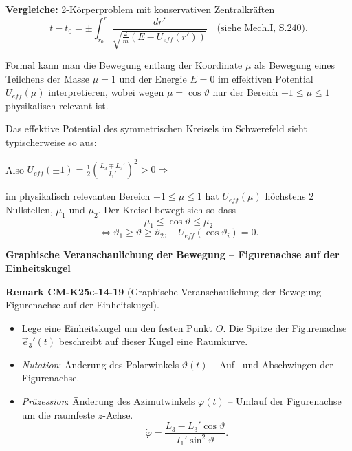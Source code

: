 \documentclass[10pt, letterpaper]{article}
\newcommand{\CustomHeading}[3]{%
  \par\medskip\noindent%
  \textbf{#1 #2} \textnormal{(#3)}.\enskip%
}
\newenvironment{REM}[2]{\begin{unitbox}\CustomHeading{Remark}{#1}{#2}}{\end{unitbox}}
\begin{document}
\textbf{Vergleiche:} 2-Körperproblem mit konservativen Zentralkräften
\[t-t_0 = \pm \int_{r_0}^r \frac{dr'}{\sqrt{\frac{2}{m}(E-U_{eff}(r'))}} \quad \text{(siehe Mech.I, S.240)}.\]

Formal kann man die Bewegung entlang der Koordinate $\mu$ als Bewegung eines Teilchens der Masse $\mu=1$ und der Energie $E=0$ im effektiven Potential $U_{eff}(\mu)$ interpretieren, wobei wegen $\mu=\cos\vartheta$ nur der Bereich $-1\leq\mu\leq1$ physikalisch relevant ist.

Das effektive Potential des symmetrischen Kreisels im Schwerefeld sieht typischerweise so aus:

Also $U_{eff}(\pm 1) = \frac{1}{2}\left(\frac{L_3 \mp L_3'}{I_1'}\right)^2 > 0 \Rightarrow$

im physikalisch relevanten Bereich $-1 \leq \mu \leq 1$ hat $U_{eff}(\mu)$ höchstens 2 Nullstellen, $\mu_1$ und $\mu_2$. Der Kreisel bewegt sich so dass
\[\mu_1 \leq \cos\vartheta \leq \mu_2\]
\[\Leftrightarrow \vartheta_1 \geq \vartheta \geq \vartheta_2, \quad U_{eff}(\cos\vartheta_i) = 0.\]



\textbf{Graphische Veranschaulichung der Bewegung – Figurenachse auf der Einheitskugel}

\begin{REM}{CM-K25c-14-19}{Graphische Veranschaulichung der Bewegung – Figurenachse auf der Einheitskugel}
\begin{itemize}
  \item Lege eine Einheitskugel um den festen Punkt $O$.  
        Die Spitze der Figurenachse $\vec e_3'(t)$ beschreibt auf dieser Kugel eine Raumkurve.
  \item \emph{Nutation}: Änderung des Polarwinkels $\vartheta(t)$ – Auf– und Ab­schwingen der Figurenachse.
  \item \emph{Präzession}: Änderung des Azimutwinkels $\varphi(t)$ – Umlauf der Figurenachse um die raumfeste $z$-Achse.  
        \[
          \dot\varphi
          =\frac{L_3-L_3'\cos\vartheta}{I_1'\sin^{2}\vartheta}.
        \]
\end{itemize}
\end{REM}
\end{document}
